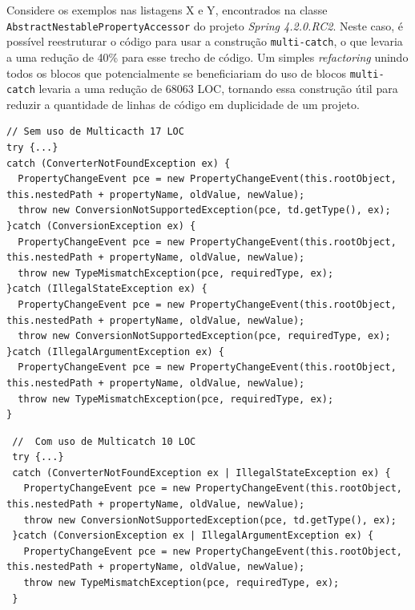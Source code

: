 Considere os exemplos nas listagens {\color{red} X e Y}, 
encontrados na classe \texttt{AbstractNestablePropertyAccessor} do projeto \textit{Spring 4.2.0.RC2}. 
Neste caso, é possível reestruturar o c\'{o}digo para usar a constru\c c\~{a}o 
\texttt{multi-catch}, o que levaria a uma redu\c c\~{a}o de {\color{red} 40\%}  para 
esse trecho de código. Um simples \textit{refactoring} unindo todos os blocos 
que potencialmente se beneficiariam do uso de blocos \texttt{multi-catch} levaria a uma redução de 
68063 \acs{LOC}, tornando essa constru\c c\~{a}o  \'{u}til para reduzir a quantidade de 
linhas de c\'{o}digo em duplicidade de um projeto. 
\begin{lstlisting}[]
// Sem uso de Multicacth 17 LOC
try {...}
catch (ConverterNotFoundException ex) {
  PropertyChangeEvent pce = new PropertyChangeEvent(this.rootObject, this.nestedPath + propertyName, oldValue, newValue);
  throw new ConversionNotSupportedException(pce, td.getType(), ex);
}catch (ConversionException ex) {
  PropertyChangeEvent pce = new PropertyChangeEvent(this.rootObject, this.nestedPath + propertyName, oldValue, newValue);
  throw new TypeMismatchException(pce, requiredType, ex);
}catch (IllegalStateException ex) {
  PropertyChangeEvent pce = new PropertyChangeEvent(this.rootObject, this.nestedPath + propertyName, oldValue, newValue);
  throw new ConversionNotSupportedException(pce, requiredType, ex);
}catch (IllegalArgumentException ex) {
  PropertyChangeEvent pce = new PropertyChangeEvent(this.rootObject, this.nestedPath + propertyName, oldValue, newValue);
  throw new TypeMismatchException(pce, requiredType, ex);
}
\end{lstlisting}


\begin{lstlisting}
 //  Com uso de Multicatch 10 LOC
 try {...}
 catch (ConverterNotFoundException ex | IllegalStateException ex) {
   PropertyChangeEvent pce = new PropertyChangeEvent(this.rootObject, this.nestedPath + propertyName, oldValue, newValue);
   throw new ConversionNotSupportedException(pce, td.getType(), ex);
 }catch (ConversionException ex | IllegalArgumentException ex) {
   PropertyChangeEvent pce = new PropertyChangeEvent(this.rootObject, this.nestedPath + propertyName, oldValue, newValue);
   throw new TypeMismatchException(pce, requiredType, ex);
 }	
\end{lstlisting}


